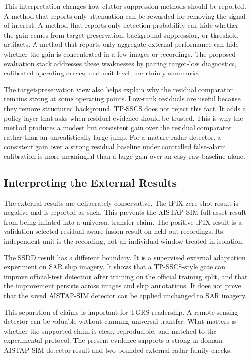 \documentclass[journal]{IEEEtran}
\begin{document}
This interpretation changes how clutter-suppression methods should be reported. A method that reports only attenuation can be rewarded for removing the signal of interest. A method that reports only detection probability can hide whether the gain comes from target preservation, background suppression, or threshold artifacts. A method that reports only aggregate external performance can hide whether the gain is concentrated in a few images or recordings. The proposed evaluation stack addresses these weaknesses by pairing target-loss diagnostics, calibrated operating curves, and unit-level uncertainty summaries.

The target-preservation view also helps explain why the residual comparator remains strong at some operating points. Low-rank residuals are useful because they remove structured background. TP-SSCS does not reject this fact. It adds a policy layer that asks when residual evidence should be trusted. This is why the method produces a modest but consistent gain over the residual comparator rather than an unrealistically large jump. For a mature radar detector, a consistent gain over a strong residual baseline under controlled false-alarm calibration is more meaningful than a large gain over an easy raw baseline alone.

\subsection{Interpreting the External Results}

The external results are deliberately conservative. The IPIX zero-shot result is negative and is reported as such. This prevents the AISTAP-SIM full-asset result from being inflated into a universal transfer claim. The positive IPIX result is a validation-selected residual-aware fusion result on held-out recordings. Its independent unit is the recording, not an individual window treated in isolation.

The SSDD result has a different boundary. It is a supervised external adaptation experiment on SAR ship imagery. It shows that a TP-SSCS-style gate can improve official-test detection after training on the official training split, and that the improvement persists across images and ship annotations. It does not prove that the saved AISTAP-SIM detector can be applied unchanged to SAR imagery.

This separation of claims is important for TGRS readership. A remote-sensing detector can be valuable without claiming universal transfer. What matters is whether the supported claim is clear, reproducible, and matched to the experimental protocol. The present evidence supports a strong in-domain AISTAP-SIM detector result and two bounded external radar-family checks.
\end{document}
